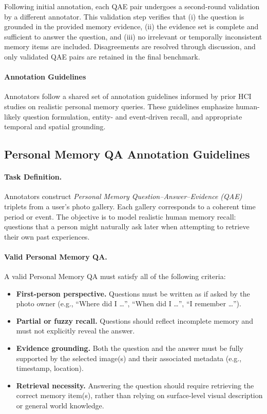 \documentclass{article}
\theoremstyle{plain}
\theoremstyle{definition}
\theoremstyle{remark}
\begin{document}
Following initial annotation, each QAE pair undergoes a second-round validation by a different annotator. This validation step verifies that (i) the question is grounded in the provided memory evidence, (ii) the evidence set is complete and sufficient to answer the question, and (iii) no irrelevant or temporally inconsistent memory items are included. Disagreements are resolved through discussion, and only validated QAE pairs are retained in the final benchmark.

\paragraph{Annotation Guidelines}

Annotators follow a shared set of annotation guidelines informed by prior HCI studies on realistic personal memory queries. These guidelines emphasize human-likely question formulation, entity- and event-driven recall, and appropriate temporal and spatial grounding.  

\subsection{Personal Memory QA Annotation Guidelines}

\paragraph{Task Definition.}
Annotators construct \emph{Personal Memory Question--Answer--Evidence (QAE)} triplets from a user’s photo gallery.
Each gallery corresponds to a coherent time period or event.
The objective is to model realistic human memory recall: questions that a person might naturally ask later when attempting to retrieve their own past experiences.

\paragraph{Valid Personal Memory QA.}
A valid Personal Memory QA must satisfy all of the following criteria:
\begin{itemize}
    \item \textbf{First-person perspective.}
    Questions must be written as if asked by the photo owner (e.g., ``Where did I \dots'', ``When did I \dots'', ``I remember \dots'').
    
    \item \textbf{Partial or fuzzy recall.}
    Questions should reflect incomplete memory and must not explicitly reveal the answer.
    
    \item \textbf{Evidence grounding.}
    Both the question and the answer must be fully supported by the selected image(s) and their associated metadata (e.g., timestamp, location).
    
    \item \textbf{Retrieval necessity.}
    Answering the question should require retrieving the correct memory item(s), rather than relying on surface-level visual description or general world knowledge.
\end{itemize}
\end{document}
